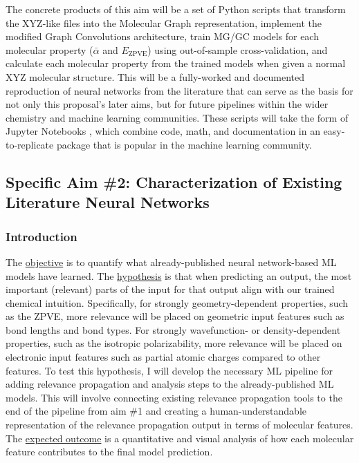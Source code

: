 \documentclass[12pt]{article}
\begin{document}
The concrete products of this aim will be a set of Python scripts that transform the XYZ-like files into the Molecular Graph representation, implement the modified Graph Convolutions architecture, train MG/GC models for each molecular property (\(\bar{\alpha}\) and \(E_\text{ZPVE}\)) using out-of-sample cross-validation, and calculate each molecular property from the trained models when given a normal XYZ molecular structure. This will be a fully-worked and documented reproduction of neural networks from the literature that can serve as the basis for not only this proposal's later aims, but for future pipelines within the wider chemistry and machine learning communities. These scripts will take the form of Jupyter Notebooks \cite{jupyter,PER-GRA:2007}, which combine code, math, and documentation in an easy-to-replicate package that is popular in the machine learning community.

\subsection{Specific Aim \#2: Characterization of Existing Literature Neural Networks}
\label{sec:org5c8eb76}

\subsubsection{Introduction}
\label{sec:org63ef9ae}

The \uline{objective} is to quantify what already-published neural network-based ML models have learned. The \uline{hypothesis} is that when predicting an output, the most important (relevant) parts of the input for that output align with our trained chemical intuition. Specifically, for strongly geometry-dependent properties, such as the ZPVE, more relevance will be placed on geometric input features such as bond lengths and bond types. For strongly wavefunction- or density-dependent properties, such as the isotropic polarizability, more relevance will be placed on electronic input features such as partial atomic charges compared to other features. To test this hypothesis, I will develop the necessary ML pipeline for adding relevance propagation and analysis steps to the already-published ML models. This will involve connecting existing relevance propagation tools \cite{JMLR:v17:15-618,github:lrp,github:lrp_tf,github:lrp_tf2} to the end of the pipeline from aim \#1 and creating a human-understandable representation of the relevance propagation output in terms of molecular features. The \uline{expected outcome} is a quantitative and visual analysis of how each molecular feature contributes to the final model prediction.
\end{document}
